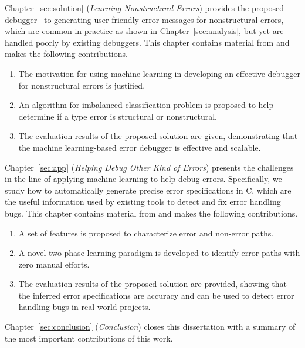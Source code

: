 \documentclass[12pt]{report}	%
\begin{document}
Chapter~\ref{sec:solution} (\emph{Learning Nonstructural Errors}) provides the proposed debugger \newCompiler\ 
to generating user friendly error messages for nonstructural errors,
which are common in practice as shown in Chapter~\ref{sec:analysis}, but yet are handled poorly by existing debuggers.
This chapter contains material from \cite{wu2017learning} and makes the following contributions.

\begin{enumerate}
\item The motivation for using machine learning in developing an effective debugger for nonstructural errors is justified.

\item An algorithm for imbalanced classification problem is proposed to help determine if a type error is structural or nonstructural.

\item The evaluation results of the proposed solution are given, demonstrating that the machine learning-based error debugger is effective and scalable.
\end{enumerate}

Chapter~\ref{sec:app} (\emph{Helping Debug Other Kind of Errors}) 
presents the challenges in the line of applying machine learning to help debug errors.
Specifically, we study how to automatically generate precise error specifications in C,
which are the useful information used by existing tools to detect and fix error handling bugs.
This chapter contains material from \cite{Wu:2019:GPE:3366395.3360586} and makes the following contributions.

\begin{enumerate}
\item A set of features is proposed to characterize error and non-error paths.

\item A novel two-phase learning paradigm is developed to identify error paths with zero manual efforts.

\item The evaluation results of the proposed solution are provided, showing that the inferred error specifications are accuracy
and can be used to detect error handling bugs in real-world projects.

\end{enumerate}

Chapter~\ref{sec:conclusion} (\emph{Conclusion}) closes this dissertation with a summary of the most important contributions of this work.
\end{document}
